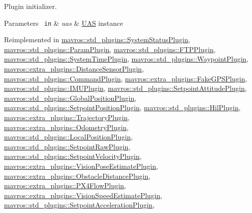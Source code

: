 Plugin initializer. 


\begin{DoxyParams}[1]{Parameters}
\mbox{\texttt{ in}}  & {\em uas} & {\ttfamily \mbox{\hyperlink{classmavros_1_1UAS}{U\+AS}}} instance \\
\hline
\end{DoxyParams}


Reimplemented in \mbox{\hyperlink{group__plugin_ga6db82bbd7c82ba5963472e1946431313}{mavros\+::std\+\_\+plugins\+::\+System\+Status\+Plugin}}, \mbox{\hyperlink{group__plugin_gad1185b49c13a316fd54ef08895ac012e}{mavros\+::std\+\_\+plugins\+::\+Param\+Plugin}}, \mbox{\hyperlink{group__plugin_ga7249eb6cdb3de93652df3b8cf3ea53c0}{mavros\+::std\+\_\+plugins\+::\+F\+T\+P\+Plugin}}, \mbox{\hyperlink{group__plugin_ga37f8fa27ccd8cf66cb81479cba446150}{mavros\+::std\+\_\+plugins\+::\+System\+Time\+Plugin}}, \mbox{\hyperlink{group__plugin_gaeacb83ea00ebb3446b99f88a573c9a86}{mavros\+::std\+\_\+plugins\+::\+Waypoint\+Plugin}}, \mbox{\hyperlink{group__plugin_gaea43cccb03d7eed62db5d9e9bfc3912a}{mavros\+::extra\+\_\+plugins\+::\+Distance\+Sensor\+Plugin}}, \mbox{\hyperlink{group__plugin_ga4093176dbbf2e0118a02d423d19f9faf}{mavros\+::std\+\_\+plugins\+::\+Command\+Plugin}}, \mbox{\hyperlink{group__plugin_gafcd498b4d7ddb485258eaade7b3aea3f}{mavros\+::extra\+\_\+plugins\+::\+Fake\+G\+P\+S\+Plugin}}, \mbox{\hyperlink{group__plugin_ga93f6f8e41038c821e395ef26bd27c905}{mavros\+::std\+\_\+plugins\+::\+I\+M\+U\+Plugin}}, \mbox{\hyperlink{group__plugin_ga99901f90ec1683567962b8d131efe84e}{mavros\+::std\+\_\+plugins\+::\+Setpoint\+Attitude\+Plugin}}, \mbox{\hyperlink{group__plugin_ga41dceb095bbd1b8b99c46c9a277bb7a9}{mavros\+::std\+\_\+plugins\+::\+Global\+Position\+Plugin}}, \mbox{\hyperlink{group__plugin_ga2bc831f4a3bdab8f284ead3bbc761181}{mavros\+::std\+\_\+plugins\+::\+Setpoint\+Position\+Plugin}}, \mbox{\hyperlink{group__plugin_ga1c3a000c7280d16696fcb006961ae7d2}{mavros\+::std\+\_\+plugins\+::\+Hil\+Plugin}}, \mbox{\hyperlink{group__plugin_ga2a6372c5c89e9910eb979bc01a257609}{mavros\+::extra\+\_\+plugins\+::\+Trajectory\+Plugin}}, \mbox{\hyperlink{group__plugin_gafc4d5bae52e8335f3fd027ef6c664c5a}{mavros\+::extra\+\_\+plugins\+::\+Odometry\+Plugin}}, \mbox{\hyperlink{group__plugin_gaade9f826008c705ea3cd120c7154e26c}{mavros\+::std\+\_\+plugins\+::\+Local\+Position\+Plugin}}, \mbox{\hyperlink{group__plugin_gaf4feaba098393f1b9f496e7ab47781a3}{mavros\+::std\+\_\+plugins\+::\+Setpoint\+Raw\+Plugin}}, \mbox{\hyperlink{group__plugin_ga0edbf48d95b744f3a8cb1741556541dc}{mavros\+::std\+\_\+plugins\+::\+Setpoint\+Velocity\+Plugin}}, \mbox{\hyperlink{group__plugin_gac952eeee9513bc64dffeec777c8404dc}{mavros\+::extra\+\_\+plugins\+::\+Vision\+Pose\+Estimate\+Plugin}}, \mbox{\hyperlink{group__plugin_gaf7844065d4ccf3cea88c251437553991}{mavros\+::extra\+\_\+plugins\+::\+Obstacle\+Distance\+Plugin}}, \mbox{\hyperlink{group__plugin_ga6b15368f120713a52cb776ad210a052b}{mavros\+::extra\+\_\+plugins\+::\+P\+X4\+Flow\+Plugin}}, \mbox{\hyperlink{group__plugin_ga81a7aa98620a46b76f89020201d47198}{mavros\+::extra\+\_\+plugins\+::\+Vision\+Speed\+Estimate\+Plugin}}, \mbox{\hyperlink{group__plugin_gaff69fabd330e14673218e9a83b314ba6}{mavros\+::std\+\_\+plugins\+::\+Setpoint\+Acceleration\+Plugin}}, 